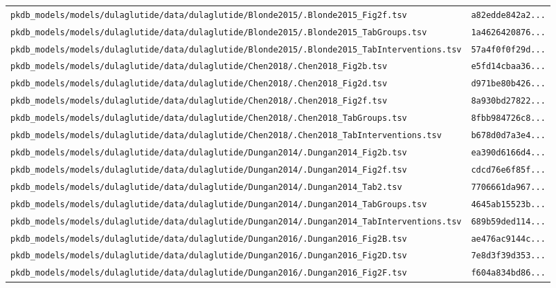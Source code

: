 \documentclass{article}
\begin{document}
\begin{longtable}{ll}
\texttt{pkdb\_models/models/dulaglutide/data/dulaglutide/Blonde2015/.Blonde2015\_Fig2f.tsv} & \texttt{a82edde842a2...} \\
\texttt{pkdb\_models/models/dulaglutide/data/dulaglutide/Blonde2015/.Blonde2015\_TabGroups.tsv} & \texttt{1a4626420876...} \\
\texttt{pkdb\_models/models/dulaglutide/data/dulaglutide/Blonde2015/.Blonde2015\_TabInterventions.tsv} & \texttt{57a4f0f0f29d...} \\
\texttt{pkdb\_models/models/dulaglutide/data/dulaglutide/Chen2018/.Chen2018\_Fig2b.tsv} & \texttt{e5fd14cbaa36...} \\
\texttt{pkdb\_models/models/dulaglutide/data/dulaglutide/Chen2018/.Chen2018\_Fig2d.tsv} & \texttt{d971be80b426...} \\
\texttt{pkdb\_models/models/dulaglutide/data/dulaglutide/Chen2018/.Chen2018\_Fig2f.tsv} & \texttt{8a930bd27822...} \\
\texttt{pkdb\_models/models/dulaglutide/data/dulaglutide/Chen2018/.Chen2018\_TabGroups.tsv} & \texttt{8fbb984726c8...} \\
\texttt{pkdb\_models/models/dulaglutide/data/dulaglutide/Chen2018/.Chen2018\_TabInterventions.tsv} & \texttt{b678d0d7a3e4...} \\
\texttt{pkdb\_models/models/dulaglutide/data/dulaglutide/Dungan2014/.Dungan2014\_Fig2b.tsv} & \texttt{ea390d6166d4...} \\
\texttt{pkdb\_models/models/dulaglutide/data/dulaglutide/Dungan2014/.Dungan2014\_Fig2f.tsv} & \texttt{cdcd76e6f85f...} \\
\texttt{pkdb\_models/models/dulaglutide/data/dulaglutide/Dungan2014/.Dungan2014\_Tab2.tsv} & \texttt{7706661da967...} \\
\texttt{pkdb\_models/models/dulaglutide/data/dulaglutide/Dungan2014/.Dungan2014\_TabGroups.tsv} & \texttt{4645ab15523b...} \\
\texttt{pkdb\_models/models/dulaglutide/data/dulaglutide/Dungan2014/.Dungan2014\_TabInterventions.tsv} & \texttt{689b59ded114...} \\
\texttt{pkdb\_models/models/dulaglutide/data/dulaglutide/Dungan2016/.Dungan2016\_Fig2B.tsv} & \texttt{ae476ac9144c...} \\
\texttt{pkdb\_models/models/dulaglutide/data/dulaglutide/Dungan2016/.Dungan2016\_Fig2D.tsv} & \texttt{7e8d3f39d353...} \\
\texttt{pkdb\_models/models/dulaglutide/data/dulaglutide/Dungan2016/.Dungan2016\_Fig2F.tsv} & \texttt{f604a834bd86...} \\

\end{longtable}
\end{document}
